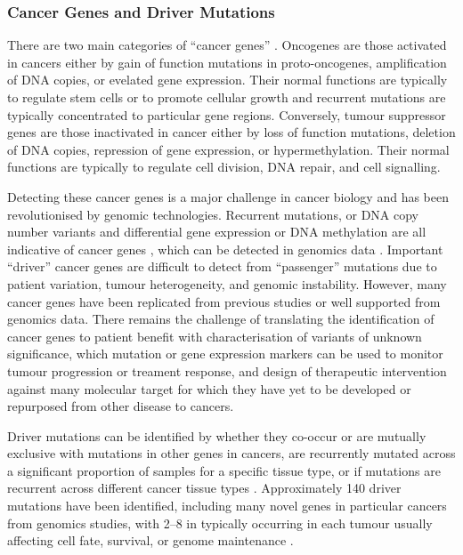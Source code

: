 \subsubsection{Cancer Genes and Driver Mutations}
There are two main categories of ``cancer genes'' \citep{Futreal2001}. Oncogenes are those activated in cancers either by gain of function mutations in proto-oncogenes, amplification of DNA copies, or evelated gene expression. Their normal functions are typically to regulate stem cells or to promote cellular growth and recurrent mutations are typically concentrated to particular gene regions. Conversely, tumour suppressor genes are those inactivated in cancer either by loss of function mutations, deletion of DNA copies, repression of gene expression, or hypermethylation. Their normal functions are typically to regulate cell division, DNA repair, and cell signalling.

Detecting these cancer genes is a major challenge in cancer biology and has been revolutionised by genomic technologies. Recurrent mutations, or DNA copy number variants and differential gene expression or DNA methylation are all indicative of cancer genes \citep{Mattison2009}, which can be detected in \gls{genomics} data \citep{METABRIC2016, TCGA2013PAN}. Important ``driver'' cancer genes \citep{Stratton2009} are difficult to detect from ``passenger'' mutations due to patient variation, tumour heterogeneity, and genomic instability. However, many cancer genes have been replicated from previous studies or well supported from \gls{genomics} data. There remains the challenge of translating the identification of cancer genes to patient benefit with characterisation of variants of unknown significance, which mutation or gene expression markers can be used to monitor tumour progression or treament response, and design of therapeutic intervention against many molecular target for which they have yet to be developed or repurposed from other disease to cancers. 

Driver mutations can be identified by whether they co-occur or are mutually exclusive with mutations in other genes in cancers, are recurrently mutated across a significant proportion of samples for a specific tissue type, or if mutations are recurrent across different cancer tissue types \citep{ICGC2011, TCGA2013PAN, METABRIC2016, COSMICdb, cBioPortal}. Approximately 140 driver mutations have been identified, including many novel genes in particular cancers from \gls{genomics} studies, with 2--8 in typically occurring in each tumour usually affecting cell fate, survival, or genome maintenance \citep{Vogelstein2013}.

